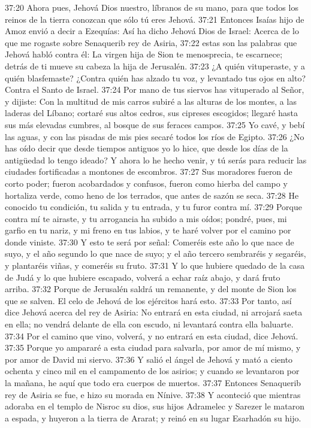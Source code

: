 37:20 Ahora pues, Jehová Dios nuestro, líbranos de su mano, para que todos los reinos de la tierra conozcan que sólo tú eres Jehová. 
37:21 Entonces Isaías hijo de Amoz envió a decir a Ezequías: Así ha dicho Jehová Dios de Israel: Acerca de lo que me rogaste sobre Senaquerib rey de Asiria, 
37:22 estas son las palabras que Jehová habló contra él: La virgen hija de Sion te menosprecia, te escarnece; detrás de ti mueve su cabeza la hija de Jerusalén. 
37:23 ¿A quién vituperaste, y a quién blasfemaste? ¿Contra quién has alzado tu voz, y levantado tus ojos en alto? Contra el Santo de Israel. 
37:24 Por mano de tus siervos has vituperado al Señor, y dijiste: Con la multitud de mis carros subiré a las alturas de los montes, a las laderas del Líbano; cortaré sus altos cedros, sus cipreses escogidos; llegaré hasta sus más elevadas cumbres, al bosque de sus feraces campos. 
37:25 Yo cavé, y bebí las aguas, y con las pisadas de mis pies secaré todos los ríos de Egipto. 
37:26 ¿No has oído decir que desde tiempos antiguos yo lo hice, que desde los días de la antigüedad lo tengo ideado? Y ahora lo he hecho venir, y tú serás para reducir las ciudades fortificadas a montones de escombros. 
37:27 Sus moradores fueron de corto poder; fueron acobardados y confusos, fueron como hierba del campo y hortaliza verde, como heno de los terrados, que antes de sazón se seca. 
37:28 He conocido tu condición, tu salida y tu entrada, y tu furor contra mí. 
37:29 Porque contra mí te airaste, y tu arrogancia ha subido a mis oídos; pondré, pues, mi garfio en tu nariz, y mi freno en tus labios, y te haré volver por el camino por donde viniste. 
37:30 Y esto te será por señal: Comeréis este año lo que nace de suyo, y el año segundo lo que nace de suyo; y el año tercero sembraréis y segaréis, y plantaréis viñas, y comeréis su fruto. 
37:31 Y lo que hubiere quedado de la casa de Judá y lo que hubiere escapado, volverá a echar raíz abajo, y dará fruto arriba. 
37:32 Porque de Jerusalén saldrá un remanente, y del monte de Sion los que se salven. El celo de Jehová de los ejércitos hará esto. 
37:33 Por tanto, así dice Jehová acerca del rey de Asiria: No entrará en esta ciudad, ni arrojará saeta en ella; no vendrá delante de ella con escudo, ni levantará contra ella baluarte. 
37:34 Por el camino que vino, volverá, y no entrará en esta ciudad, dice Jehová. 
37:35 Porque yo ampararé a esta ciudad para salvarla, por amor de mí mismo, y por amor de David mi siervo. 
37:36 Y salió el ángel de Jehová y mató a ciento ochenta y cinco mil en el campamento de los asirios; y cuando se levantaron por la mañana, he aquí que todo era cuerpos de muertos. 
37:37 Entonces Senaquerib rey de Asiria se fue, e hizo su morada en Nínive. 
37:38 Y aconteció que mientras adoraba en el templo de Nisroc su dios, sus hijos Adramelec y Sarezer le mataron a espada, y huyeron a la tierra de Ararat; y reinó en su lugar Esarhadón su hijo. 
